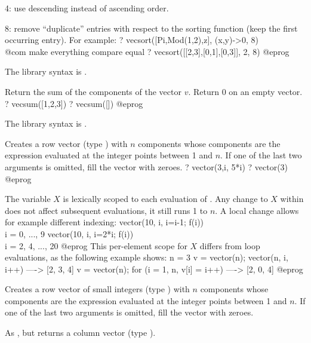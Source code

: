 \item 4: use descending instead of ascending order.

\item 8: remove ``duplicate'' entries with respect to the sorting function
(keep the first occurring entry).  For example:
\bprog
  ? vecsort([Pi,Mod(1,2),z], (x,y)->0, 8)   \\@com make everything compare equal
  ? vecsort([[2,3],[0,1],[0,3]], 2, 8)
@eprog

The library syntax is .

\label{se:vecsum}
Return the sum of the components of the vector $v$. Return $0$ on an
empty vector.
\bprog
? vecsum([1,2,3])
? vecsum([])
@eprog

The library syntax is .

\label{se:vector}
Creates a row vector (type
) with $n$ components whose components are the expression
 evaluated at the integer points between 1 and $n$. If one of the
last two arguments is omitted, fill the vector with zeroes.
\bprog
? vector(3,i, 5*i)
? vector(3)
@eprog

The variable $X$ is lexically scoped to each evaluation of .  Any
change to $X$ within  does not affect subsequent evaluations, it
still runs 1 to $n$.  A local change allows for example different indexing:
\bprog
vector(10, i, i=i-1; f(i)) \\ i = 0, ..., 9
vector(10, i, i=2*i; f(i)) \\ i = 2, 4, ..., 20
@eprog\noindent
This per-element scope for $X$ differs from  loop evaluations,
as the following example shows:
\bprog
n = 3
v = vector(n); vector(n, i, i++)            ----> [2, 3, 4]
v = vector(n); for (i = 1, n, v[i] = i++)   ----> [2, 0, 4]
@eprog\noindent

\label{se:vectorsmall}
Creates a row vector of small integers (type
) with $n$ components whose components are the expression
 evaluated at the integer points between 1 and $n$. If one of the
last two arguments is omitted, fill the vector with zeroes.

\label{se:vectorv}
As , but returns a column vector (type ).

